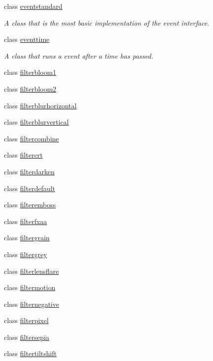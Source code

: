 \begin{DoxyCompactItemize}
class \hyperlink{classflounder_1_1eventstandard}{eventstandard}
\begin{DoxyCompactList}\small\item\em A class that is the most basic implementation of the event interface. \end{DoxyCompactList}\item 
class \hyperlink{classflounder_1_1eventtime}{eventtime}
\begin{DoxyCompactList}\small\item\em A class that runs a event after a time has passed. \end{DoxyCompactList}\item 
class \hyperlink{classflounder_1_1filterbloom1}{filterbloom1}
\item 
class \hyperlink{classflounder_1_1filterbloom2}{filterbloom2}
\item 
class \hyperlink{classflounder_1_1filterblurhorizontal}{filterblurhorizontal}
\item 
class \hyperlink{classflounder_1_1filterblurvertical}{filterblurvertical}
\item 
class \hyperlink{classflounder_1_1filtercombine}{filtercombine}
\item 
class \hyperlink{classflounder_1_1filtercrt}{filtercrt}
\item 
class \hyperlink{classflounder_1_1filterdarken}{filterdarken}
\item 
class \hyperlink{classflounder_1_1filterdefault}{filterdefault}
\item 
class \hyperlink{classflounder_1_1filteremboss}{filteremboss}
\item 
class \hyperlink{classflounder_1_1filterfxaa}{filterfxaa}
\item 
class \hyperlink{classflounder_1_1filtergrain}{filtergrain}
\item 
class \hyperlink{classflounder_1_1filtergrey}{filtergrey}
\item 
class \hyperlink{classflounder_1_1filterlensflare}{filterlensflare}
\item 
class \hyperlink{classflounder_1_1filtermotion}{filtermotion}
\item 
class \hyperlink{classflounder_1_1filternegative}{filternegative}
\item 
class \hyperlink{classflounder_1_1filterpixel}{filterpixel}
\item 
class \hyperlink{classflounder_1_1filtersepia}{filtersepia}
\item 
class \hyperlink{classflounder_1_1filtertiltshift}{filtertiltshift}

\end{DoxyCompactItemize}
